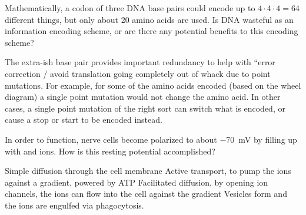 \documentclass[quiz,addpoints,noanswers]{exam}
\begin{document}
\begin{questions}
\question[1]  Mathematically, a codon of three DNA base pairs could encode up to $4\cdot4\cdot4=64$ different things, but only about 20 amino acids are used. Is DNA wasteful as an information encoding scheme, or are there any potential benefits to this encoding scheme?
\begin{solution}[1in]
The extra-ish base pair provides important redundancy to help with ``error correction / avoid translation going completely out of whack due to point mutations. For example, for some of the amino acids encoded (based on the wheel diagram) a single point mutation would not change the amino acid. In other cases, a single point mutation of the right sort can switch what is encoded, or cause a stop or start to be encoded instead. 
\end{solution}

\question[1] In order to function, nerve cells become polarized to about \SI{-70}{\milli\volt} by filling up with  and  ions. How is this resting potential accomplished?
\begin{choices}
\choice Simple diffusion through the cell membrane
\CorrectChoice Active transport, to pump the ions against a gradient, powered by ATP 
\choice Facilitated diffusion, by opening ion channels, the ions can flow into the cell against the gradient
\choice Vesicles form and the ions are engulfed via phagocytosis.
\end{choices}
\end{questions}
\end{document}
